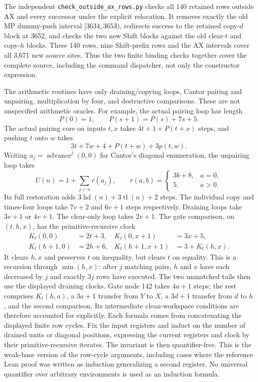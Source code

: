 The independent \texttt{check\_outside\_ax\_rows.py} checks all
140 retained rows outside AX and every successor under the explicit
relocation.  It removes exactly the old MP dummy-push interval
$[3634,3653)$, redirects success to the retained copy-$d$ block at
3652, and checks the two new Shift blocks against the old clear-$t$
and copy-$h$ blocks.  These 140 rows, nine Shift-prefix rows and
the AX intervals cover all 3,671 new source sites.  Thus the two
finite binding checks together cover the complete source, including
the command dispatcher, not only the constructor expression.

The arithmetic routines have only
draining/copying loops, Cantor pairing and unpairing, multiplication
by four, and destructive comparisons.  These are not unspecified
arithmetic oracles.  For example, the actual pairing loop has length
\[
 P(0)=1,\qquad P(s+1)=P(s)+7s+5.
\]
The actual pairing core on inputs $t,x$ takes $4t+1+P(t+x)$ steps,
and pushing $t$ onto $w$ takes
\[
        3t+7w+4+P(t+w)+3p(t,w).
\]
Writing $a_j=\operatorname{advance}^j(0,0)$ for Cantor's diagonal
enumeration, the unpairing loop takes
\[
 U(n)=1+\sum_{j<n}r(a_j),\qquad
 r(a,b)=\begin{cases}3b+8,&a=0,\\5,&a>0.\end{cases}
\]
Its full restoration adds
$3\operatorname{hd}(n)+3\operatorname{tl}(n)+2$ steps.
The individual copy and times-four loops take $7v+2$ and $6v+1$
steps respectively.  Draining loops take $3v+1$ or $4v+1$.
The clear-only loop takes $2v+1$.  The gate comparison, on
$(t,h,x)$, has the primitive-recursive clock
\begin{align*}
 K_t(0,0)&=2t+3,& K_t(0,x+1)&=3x+5,\\
 K_t(h+1,0)&=2h+6,&K_t(h+1,x+1)&=3+K_t(h,x).
\end{align*}
It clears $h,x$ and preserves $t$ on inequality, but clears $t$
on equality.  This is a recursion through $\min(h,x)$: after
$j$ matching pairs, $h$ and $x$ have each decreased by $j$ and
exactly $3j$ rows have executed.  The two unmatched tails then
use the displayed draining clocks.  Gate node 142 takes $4a+1$
steps; the rest comprises $K_t(h,a)$, a $3a+1$ transfer from
$Y$ to $X$, a $3d+1$ transfer from $d$ to $h$, and the second
comparison.  Its intermediate clean-workspace conditions are
therefore accounted for explicitly.
Each formula comes from concatenating the displayed finite row
cycles.  Fix the input registers and induct on the number of
drained units or diagonal positions, expressing the current
registers and clock by their primitive-recursive iterates.  The
invariant is then quantifier-free.  This is the weak-base version
of the row-cycle arguments, including cases where the reference
Lean proof was written as induction generalizing a second register.
No universal quantifier over arbitrary environments is used as
an induction formula.

